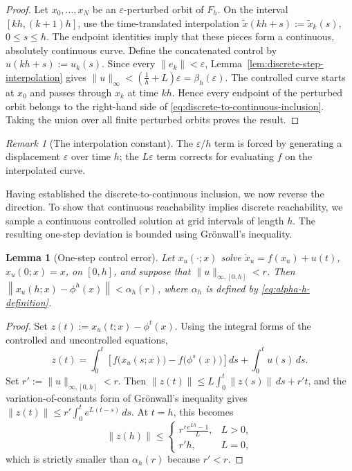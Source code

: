 \documentclass[pdflatex,sn-mathphys-num]{sn-jnl}
\numberwithin{equation}{section}
\theoremstyle{thmstyleone}%
\newtheorem{lemma}[theorem]{Lemma}
\theoremstyle{definition}
\theoremstyle{remark}
\newtheorem{remark}[theorem]{Remark}
\begin{document}
\begin{proof}
Let $x_0,\ldots,x_N$ be an $\varepsilon$-perturbed orbit of $F_h$. On the interval $[kh,(k+1)h]$, use the time-translated interpolation $\widetilde x(kh+s):=\widetilde x_k(s)$, $0\leq s\leq h$. The endpoint identities imply that these pieces form a continuous, absolutely continuous curve. Define the concatenated control by $u(kh+s):=u_k(s)$. Since every $\|e_k\|<\varepsilon$, Lemma~\ref{lem:discrete-step-interpolation} gives
    $\|u\|_\infty
    <
    \left(\frac1h+L\right)\varepsilon
    =
    \beta_h(\varepsilon)$.
The controlled curve starts at $x_0$ and passes through $x_k$ at time $kh$. Hence every endpoint of the perturbed orbit belongs to the right-hand side of \eqref{eq:discrete-to-continuous-inclusion}. Taking the union over all finite perturbed orbits proves the result.
\end{proof}

\begin{remark}[The interpolation constant]
\label{rem:interpolation-constant}
The $\varepsilon/h$ term is forced by generating a displacement $\varepsilon$ over time $h$; the $L\varepsilon$ term corrects for evaluating $f$ on the interpolated curve.
\end{remark}

Having established the discrete-to-continuous inclusion, we now reverse the direction. To show that continuous reachability implies discrete reachability, we sample a continuous controlled solution at grid intervals of length $h$. The resulting one-step deviation is bounded using Gr\"onwall's inequality.

\begin{lemma}[One-step control error]
\label{lem:one-step-control-error}
Let $x_u(\cdot;x)$ solve
    $\dot x_u=f(x_u)+u(t)$,
    $x_u(0;x)=x$,
on $[0,h]$, and suppose that $\|u\|_{\infty,[0,h]}<r$. Then
    $\left\|
    x_u(h;x)-\phi^h(x)
    \right\|
    <
    \alpha_h(r)$,
where $\alpha_h$ is defined by \eqref{eq:alpha-h-definition}.
\end{lemma}

\begin{proof}
Set
    $z(t):=x_u(t;x)-\phi^t(x)$.
Using the integral forms of the controlled and uncontrolled equations,
\[
    z(t)
    =
    \int_0^t
    \left[
    f\bigl(x_u(s;x)\bigr)
    -
    f\bigl(\phi^s(x)\bigr)
    \right]ds
    +
    \int_0^t u(s)\,ds.
\]
Set $r':=\|u\|_{\infty,[0,h]}<r$. Then
    $\|z(t)\|
    \leq
    L\int_0^t\|z(s)\|\,ds+r't$,
and the variation-of-constants form of Gr\"onwall's inequality gives
    $\|z(t)\|
    \leq
    r'\int_0^t e^{L(t-s)}\,ds$.
At $t=h$, this becomes
\[
    \|z(h)\|
    \leq
    \begin{cases}
    \displaystyle
    r'\frac{e^{Lh}-1}{L},&L>0,\\[2ex]
    r'h,&L=0,
    \end{cases}
\]
which is strictly smaller than $\alpha_h(r)$ because $r'<r$.
\end{proof}
\end{document}
